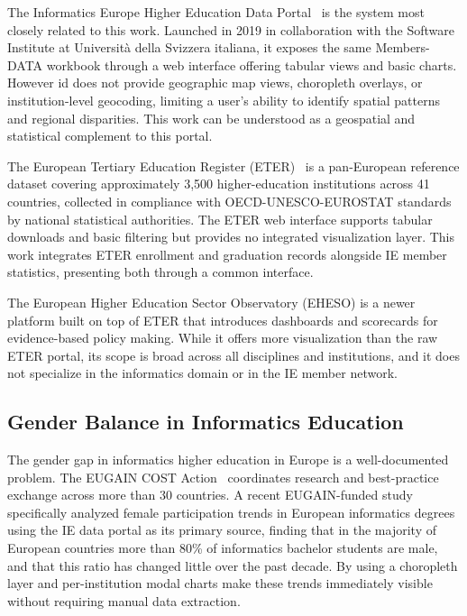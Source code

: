 \documentclass[final,3p,times,twocolumn]{elsarticle}
\begin{document}
The Informatics Europe Higher Education Data Portal~\cite{IEPortal2023} is the system most closely related to this work. Launched in 2019 in collaboration with the Software Institute at Università della Svizzera italiana, it exposes the same Members-DATA workbook through a web interface offering tabular views and basic charts. However id does not provide geographic map views, choropleth overlays, or institution-level geocoding, limiting a user's ability to identify spatial patterns and regional disparities. This work can be understood as a geospatial and statistical complement to this portal.

The European Tertiary Education Register (ETER)~\cite{Lepori2023} is a pan-European reference dataset covering approximately 3,500 higher-education institutions across 41 countries, collected in compliance with OECD-UNESCO-EUROSTAT standards by national statistical authorities. The ETER web interface supports tabular downloads and basic filtering but provides no integrated visualization layer. This work integrates ETER enrollment and graduation records alongside IE member statistics, presenting both through a common interface.

The European Higher Education Sector Observatory (EHESO) is a newer platform built on top of ETER that introduces dashboards and scorecards for evidence-based policy making. While it offers more visualization than the raw ETER portal, its scope is broad across all disciplines and institutions, and it does not specialize in the informatics domain or in the IE member network.

\subsection{Gender Balance in Informatics Education}

The gender gap in informatics higher education in Europe is a well-documented problem. The EUGAIN COST Action~\cite{EUGAIN2024} coordinates research and best-practice exchange across more than 30 countries. A recent EUGAIN-funded study~\cite{DAngelo2024} specifically analyzed female participation trends in European informatics degrees using the IE data portal as its primary source, finding that in the majority of European countries more than 80\% of informatics bachelor students are male, and that this ratio has changed little over the past decade. By using a choropleth layer and per-institution modal charts make these trends immediately visible without requiring manual data extraction.
\end{document}
